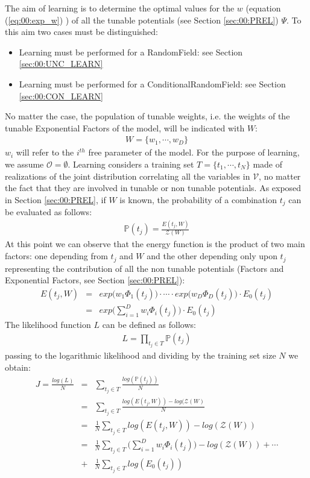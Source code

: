 The aim of learning is to determine the optimal values for the $w$ (equation (\ref{eq:00:exp_w}) ) of all the tunable potentials (see Section \ref{sec:00:PREL}) $\Psi$.
To this aim two cases must be distinguished:
\begin{itemize}
\item Learning must be performed for a RandomField: see Section \ref{sec:00:UNC_LEARN}
\item Learning must be performed for a ConditionalRandomField: see Section \ref{sec:00:CON_LEARN} 
\end{itemize}
No matter the case, the population of tunable weights, i.e. the weights of the tunable Exponential Factors of the model, will be indicated with $W$:
\begin{eqnarray}
W = \lbrace w_1,\cdots , w_D \rbrace
\end{eqnarray}
$w_i$ will refer to the $i^{th}$ free parameter of the model.
For the purpose of learning, we assume $\mathcal{O} = \emptyset$. Learning considers a training set $T = \lbrace t_1, \cdots ,t_N \rbrace$ made of realizations of the joint distribution correlating all the variables in $\mathcal{V}$, no matter the fact that they are involved in tunable or non tunable potentials.
As exposed in Section \ref{sec:00:PREL}, if $W$ is known, the probability of a combination $t_j$ can be evaluated as follows:
\begin{eqnarray}
\mathbb{P}(t_j) = \frac{E(t_j, W)}{\mathcal{Z}(W)}
\end{eqnarray}
At this point we can observe that the energy function is the product of two main factors: one depending from $t_j$ and $W$  and the other depending only upon $t_j$ representing the contribution of all the non tunable potentials (Factors and Exponential Factors, see Section \ref{sec:00:PREL}):
\begin{eqnarray}
E(t_j, W) &=&  exp \big( w_1 \Phi _1(t_j) \big) \cdot \cdots \cdot exp \big( w_D \Phi _D(t_j) \big) \cdot E_0(t_j) \nonumber\\
		  &=& exp \big( \sum _{i=1} ^{D} w_i \Phi _i(t_j) \big) \cdot E_0(t_j)
\end{eqnarray}
The likelihood function $L$ can be defined as follows:
\begin{eqnarray}
L = \prod _{t_j \in T} \mathbb{P}(t_j) 
\end{eqnarray}
passing to the logarithmic likelihood and dividing by the training set size $N$ we obtain:
\begin{eqnarray}
J = \frac{log(L)}{N} &=& \sum _{t_j \in T} \frac{log(\mathbb{P}(t_j))}{N} \nonumber\\
   					 &=& \sum _{t_j \in T} \frac{ log(E(t_j, W)) - log(\mathcal{Z}(W) }{N} \nonumber\\
   					 &=& \frac{1}{N} \sum _{t_j \in T}  log(E(t_j, W)) - log(\mathcal{Z}(W)) \nonumber\\
   					 &=& \frac{1}{N} \sum _{t_j \in T}  \big( \sum _{i=1} ^{D} w_i \Phi _i(t_j) \big)
   					     -log(\mathcal{Z}(W)) + \cdots \nonumber\\
   					 	 &+& \frac{1}{N} \sum _{t_j \in T}  log(E_0 (t_j))
   					 	 \label{eq:00:J_learn}
\end{eqnarray}
